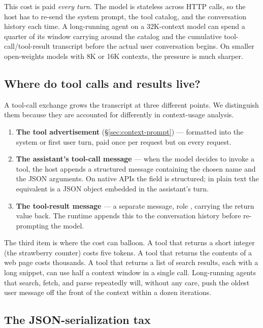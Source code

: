 This cost is paid \emph{every turn}. The model is stateless across
HTTP calls, so the host has to re-send the system prompt, the tool
catalog, and the conversation history each time. A long-running
agent on a 32K-context model can spend a quarter of its window
carrying around the catalog and the cumulative
tool-call/tool-result transcript before the actual user
conversation begins. On smaller open-weights models with 8K or 16K
contexts, the pressure is much sharper.

\subsection{Where do tool calls and results live?}
\label{sec:context-transcript}

A tool-call exchange grows the transcript at three different points.
We distinguish them because they are accounted for differently in
context-usage analysis.

\begin{enumerate}[label=(\roman*)]
\item \textbf{The tool advertisement} (\S\ref{sec:context-prompt})
  --- formatted into the system or first user turn, paid once per
  request but on every request.
\item \textbf{The assistant's tool-call message} --- when the model
  decides to invoke a tool, the host appends a structured
   message containing the chosen name and the JSON
  arguments. On native APIs the field is structured; in plain text
  the equivalent is a JSON object embedded in the assistant's turn.
\item \textbf{The tool-result message} --- a separate message, role
  , carrying the return value back. The runtime appends
  this to the conversation history before re-prompting the model.
\end{enumerate}

\noindent
The third item is where the cost can balloon. A tool that returns a
short integer (the strawberry counter) costs five tokens. A tool
that returns the contents of a web page costs thousands. A tool that
returns a list of search results, each with a long snippet, can use
half a context window in a single call. Long-running agents that
search, fetch, and parse repeatedly will, without any care, push the
oldest user message off the front of the context within a dozen
iterations.

\subsection{The JSON-serialization tax}
\label{sec:context-json}

